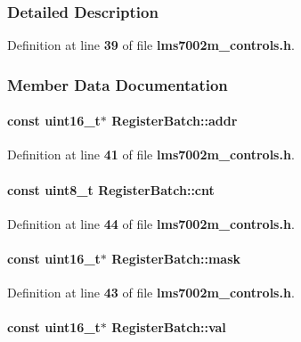 \subsubsection{Detailed Description}


Definition at line {\bf 39} of file {\bf lms7002m\+\_\+controls.\+h}.



\subsubsection{Member Data Documentation}
\paragraph[{addr}]{\setlength{\rightskip}{0pt plus 5cm}const uint16\+\_\+t$\ast$ Register\+Batch\+::addr}\label{structRegisterBatch_a7746e6f72825a14560cff25f5b6823df}


Definition at line {\bf 41} of file {\bf lms7002m\+\_\+controls.\+h}.

\paragraph[{cnt}]{\setlength{\rightskip}{0pt plus 5cm}const uint8\+\_\+t Register\+Batch\+::cnt}\label{structRegisterBatch_ade5354d449ad932bb93712c04c24d041}


Definition at line {\bf 44} of file {\bf lms7002m\+\_\+controls.\+h}.

\paragraph[{mask}]{\setlength{\rightskip}{0pt plus 5cm}const uint16\+\_\+t$\ast$ Register\+Batch\+::mask}\label{structRegisterBatch_a486961a62d83d28fc83701ec3acda7d2}


Definition at line {\bf 43} of file {\bf lms7002m\+\_\+controls.\+h}.

\paragraph[{val}]{\setlength{\rightskip}{0pt plus 5cm}const uint16\+\_\+t$\ast$ Register\+Batch\+::val}\label{structRegisterBatch_a8a8d61c36411a949c954ab9f1de5cabf}


